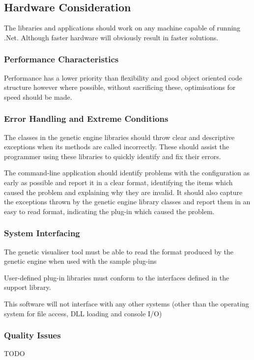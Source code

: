 \documentclass[a4paper]{article}
\begin{document}
\subsection{Hardware Consideration}
The libraries and applications should work on any machine capable of running .Net. Although faster hardware will obviously result in faster solutions.


\subsubsection{Performance Characteristics}
Performance has a lower priority than flexibility and good object oriented code structure however where possible, without sacrificing these, optimisations for speed should be made.

\subsubsection{Error Handling and Extreme Conditions}
The classes in the genetic engine libraries should throw clear and descriptive exceptions when its methods are called incorrectly. These should assist the programmer using these libraries to quickly identify and fix their errors.

The command-line application should identify problems with the configuration as early as possible and report it in a clear format, identifying the items which caused the problem and explaining why they are invalid. It should also capture the exceptions thrown by the genetic engine library classes and report them in an easy to read format, indicating the plug-in which caused the problem.

\subsubsection{System Interfacing}
The genetic visualiser tool must be able to read the format produced by the genetic engine when used with the sample plug-ins

User-defined plug-in libraries must conform to the interfaces defined in the support library.

This software will not interface with any other systems (other than the operating system for file access, DLL loading and console I/O) 

\subsubsection{Quality Issues}
TODO
\end{document}
